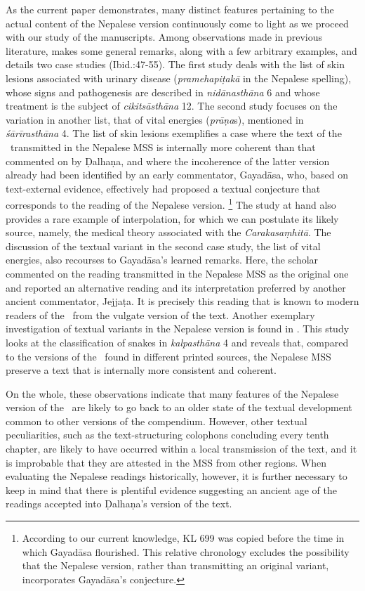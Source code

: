As the current paper demonstrates, many distinct features pertaining to the actual content of the Nepalese version continuously come to light as we proceed with our study of the manuscripts. Among observations made in previous literature, \citet[44-47]{kleb-2021b} makes some general remarks, along with a few arbitrary examples, and details two case studies (Ibid.:47-55). The first study deals with the list of skin lesions associated with urinary disease (\emph{pramehapiṭakā} in the Nepalese spelling), whose signs and pathogenesis are described in \emph{nidānasthāna} 6 and whose treatment is the subject of \emph{cikitsāsthāna} 12. The second study focuses on the variation in another list, that of vital energies (\emph{prāṇa}s), mentioned in \emph{śārīrasthāna} 4. The list of skin lesions exemplifies a case where the text of the \SS\ transmitted in the Nepalese MSS is internally more coherent than that commented on by Ḍalhaṇa, and where the incoherence of the latter version already had been identified by an early commentator, Gayadāsa, who, based on text-external evidence, effectively had proposed a textual conjecture that corresponds to the reading of the Nepalese version.%
    \footnote{%
    According to our current knowledge, KL 699 was copied before the time in which Gayadāsa flourished. This relative chronology excludes the possibility that the Nepalese version, rather than transmitting an original variant, incorporates Gayadāsa's conjecture.%
    }
The study at hand also provides a rare example of interpolation, for which we can postulate its likely source, namely, the medical theory associated with the \textit{Carakasaṃhitā}.
The discussion of the textual variant in the second case study, the list of vital energies, also recourses to Gayadāsa's learned remarks. Here, the scholar commented on the reading transmitted in the Nepalese MSS as the original one and reported an alternative reading and its interpretation preferred by another ancient commentator, Jejjaṭa. It is precisely this reading that is known to modern readers of the \SS\ from the vulgate version of the text.
Another exemplary investigation of textual variants in the Nepalese version is found in \citet[101–104]{hari-2011}.
This study looks at the classification of snakes in \emph{kalpasthāna} 4 and reveals that, compared to the versions of the \SS\ found in different printed sources, the Nepalese MSS preserve a text that is internally more consistent and coherent. 

On the whole, these observations indicate that many features of the Nepalese version of the \SS\ are likely to go back to an older state of the textual development common to other versions of the compendium. 
However, other textual peculiarities, such as the text-structuring colophons concluding every tenth chapter, are likely to have occurred within a local transmission of the text, and it is improbable that they are attested in the MSS from other regions. 
When evaluating the Nepalese readings historically, however, it is further necessary to keep in mind that there is plentiful evidence suggesting an ancient age of the readings accepted into Ḍalhaṇa's version of the text. 


